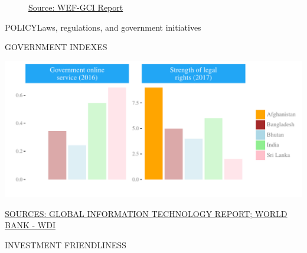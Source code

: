 \documentclass{article}\usepackage[]{graphicx}\usepackage[]{color}
\makeatletter
\def\maxwidth{ %
  \ifdim\Gin@nat@width>\linewidth
    \linewidth
  \else
    \Gin@nat@width
  \fi
}
\makeatother
\begin{document}
\begin{figure}
\begin{minipage}[t]{0.99\textwidth}
\begin{minipage}[t]{0.56\textwidth}
\begin{minipage}[c]{0.30\textwidth}
{}



    \vspace{-2ex}
    \hspace{2ex}\tiny{\href{http://reports.weforum.org/global-competitiveness-index/}{\textcolor[HTML]{22A6F5}{Source: WEF-GCI Report}}}
    \end{minipage}
  \end{minipage}
\end{minipage}
\end{figure}

\begin{minipage}[c]{0.95\textwidth}
  \begin{flushleft}  
    \hspace{4ex}\Large{\textcolor[HTML]{22A6F5}{POLICY}}\hspace{2ex}\small{\textcolor[HTML]{818181}{Laws, regulations, and government initiatives}}
  \end{flushleft}
  \begin{minipage}[c]{0.55\textwidth}
    \hspace{4ex}\small{\textcolor[HTML]{818181}{GOVERNMENT INDEXES}}
    \vspace{1ex}


\hfill{}\includegraphics[width=\maxwidth]{figure/bar_facewrap_chart_Policy-1} 



   \hspace{4ex}\scriptsize{\href{http://reports.weforum.org/global-information-technology-report-2016/}{\textcolor[HTML]{22A6F5}{SOURCES: GLOBAL INFORMATION TECHNOLOGY REPORT; }}\href{http://data.worldbank.org}{\textcolor[HTML]{22A6F5}{WORLD BANK - WDI}}}
  \end{minipage}
  \begin{minipage}[c]{0.43\textwidth}
    \small{\textcolor[HTML]{818181}{INVESTMENT FRIENDLINESS}}
    \vspace{1ex}



\end{minipage}
\end{minipage}
\end{document}
